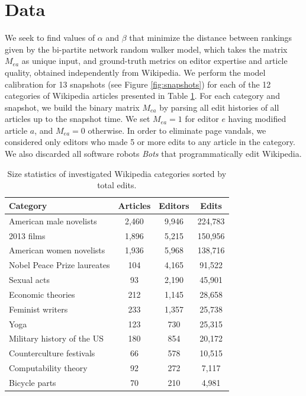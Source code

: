 \section{Data}

We seek to find values of $\alpha$ and $\beta$ that minimize the distance between rankings given by the bi-partite network random walker model, which takes the matrix $M_{ea}$ as unique input, and ground-truth metrics on editor expertise and article quality, obtained independently from Wikipedia. We perform the model calibration for 13 snapshots (see Figure \ref{fig:snapshots})  for each of  the 12 categories of Wikipedia articles presented in Table \ref{tab:statistics}. For each category and snapshot, we build the binary matrix $M_{ea}$ by parsing all edit histories of all articles up to the snapshot time. We set $M_{ea} = 1$ for editor $e$ having modified article $a$, and $M_{ea} = 0$ otherwise. In order to eliminate page vandals, we considered only editors who made 5 or more edits to any article in the category. We also discarded all software robots {\it Bots} that programmatically edit Wikipedia. 

\begin{table}
\begin{tabular}{|l|c|c|c|}
\hline
{\bf Category} &  {\bf Articles} &  {\bf Editors} &  {\bf Edits} \\
\hline
American male novelists               &      2,460 &   9,946 &  224,783 \\
2013 films                            &      1,896 &   5,215 &  150,956 \\
American women novelists              &      1,936 &   5,968 &  138,716 \\
Nobel Peace Prize laureates           &       104 &   4,165 &   91,522 \\
Sexual acts                           &        93 &   2,190 &   45,901 \\
Economic theories                     &       212 &   1,145 &   28,658 \\
Feminist writers                      &       233 &   1,357 &   25,738 \\
Yoga                                  &       123 &    730 &   25,315 \\
Military history of the US &       180 &    854 &   20,172 \\
Counterculture festivals              &        66 &    578 &   10,515 \\
Computability theory                  &        92 &    272 &    7,117 \\
Bicycle parts                         &        70 &    210 &    4,981 \\
\hline
\end{tabular}
\caption{Size statistics of investigated Wikipedia categories sorted by total edits.}
\label{tab:statistics}
\end{table}

